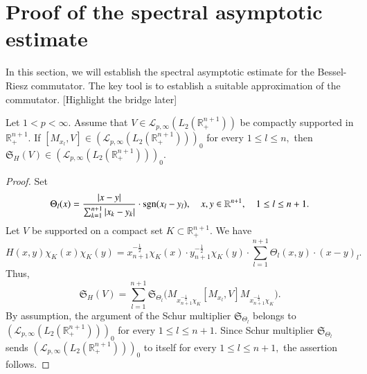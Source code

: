 \documentclass[12pt]{amsart}
\begin{document}
\section{Proof of the spectral asymptotic estimate}
\setcounter{equation}{0}
{\color{blue}In this section, we will establish the spectral asymptotic estimate for the Bessel-Riesz commutator. The key tool is to establish a suitable approximation of the commutator. [Highlight the bridge later]}
\begin{lemma}\label{abcde}
Let $1<p<\infty$. Assume that $V\in \mathcal{L}_{p,\infty}(L_2(\mathbb{R}^{n+1}_+))$ be compactly supported in $\mathbb{R}^{n+1}_+.$ If
$[M_{x_l},V]\in (\mathcal{L}_{p,\infty}(L_2(\mathbb{R}^{n+1}_+)))_0$ for every $1\leq l\leq n,$ then $\mathfrak{S}_H(V)\in (\mathcal{L}_{p,\infty}(L_2(\mathbb{R}^{n+1}_+)))_0.$
\end{lemma}
\begin{proof} Set
$$\Theta_l(x)=\frac{|x-y|}{\sum_{k=1}^{n+1}|x_k-y_k|}\cdot {\rm sgn}(x_l-y_l),\quad x,y\in\mathbb{R}^{n+1},\quad 1\leq l\leq n+1.$$
Let $V$ be supported on a compact set $K\subset \mathbb{R}^{n+1}_+.$ We have
$$H(x,y)\chi_K(x)\chi_K(y)=x_{n+1}^{-\frac12}\chi_K(x)\cdot y_{n+1}^{-\frac12}\chi_K(y)\cdot  \sum_{l=1}^{n+1}\Theta_l(x,y)\cdot (x-y)_l.$$
Thus,
$$\mathfrak{S}_H(V)=\sum_{l=1}^{n+1}\mathfrak{S}_{\Theta_l}\Big(M_{x_{n+1}^{-\frac12}\chi_K} [M_{x_l},V] M_{x_{n+1}^{-\frac12}\chi_K}\Big).$$
By assumption, the argument of the Schur multiplier $\mathfrak{S}_{\Theta_l}$ belongs to $(\mathcal{L}_{p,\infty}(L_2(\mathbb{R}^{n+1}_+)))_0$ for every $1\leq l\leq n+1.$ Since Schur multiplier $\mathfrak{S}_{\Theta_l}$ sends $(\mathcal{L}_{p,\infty}(L_2(\mathbb{R}^{n+1}_+)))_0$ to itself for every $1\leq l\leq n+1,$ the assertion follows.
\end{proof}
\end{document}
